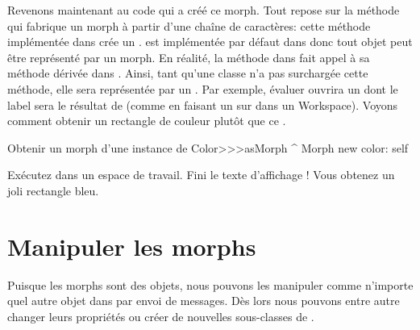 \documentclass[a4paper,10pt,twoside]{book}
\begin{document}
Revenons maintenant au code qui a créé ce morph.%
Tout repose sur la méthode qui fabrique un morph \`a partir d'une
chaîne de caractères:
cette méthode  implémentée dans
 crée un .  est
implémentée par défaut dans  donc tout objet peut
être représenté par un morph. En réalité, la méthode
 dans  fait appel \`a sa méthode dérivée
dans . Ainsi, tant qu'une classe n'a pas surchargée cette
méthode, elle sera représentée par un .
Par exemple, évaluer  ouvrira un
 dont le label sera le résultat de 
 (comme en faisant un  sur 
dans un Workspace).
Voyons comment obtenir un rectangle de couleur plutôt que ce
.

\begin{method}{Obtenir un morph d'une instance de }
Color>>>asMorph
	^ Morph new color: self
\end{method}
\noindent
Exécutez   dans un
espace de travail. Fini le texte d'affichage ! Vous
obtenez un joli rectangle bleu.


\section{Manipuler les morphs}

Puisque les morphs sont des objets, nous pouvons les manipuler comme
n'importe quel autre objet dans \st \cad par envoi de messages. Dès
lors nous pouvons entre autre changer leurs propriétés ou créer
de nouvelles sous-classes de .
\end{document}
